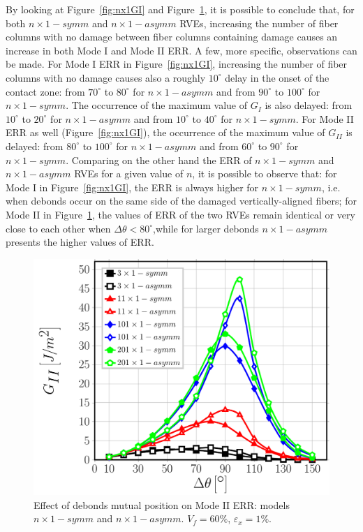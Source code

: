 \documentclass[smallextended]{svjour3}       %
\begin{document}
By looking at Figure~\ref{fig:nx1GI} and Figure~\ref{fig:nx1GII}, it is possible to conclude that, for both $n\times 1-symm$ and $n\times 1-asymm$ RVEs, increasing the number of fiber columns with no damage between fiber columns containing damage causes an increase in both Mode I and Mode II ERR. A few, more specific, observations can be made. For Mode I ERR in Figure~\ref{fig:nx1GI}, increasing the number of fiber columns with no damage causes also a roughly $10^{\circ}$ delay in the onset of the contact zone: from $70^\circ$ to $80^\circ$ for $n\times 1-asymm$ and from $90^\circ$ to $100^\circ$ for $n\times 1-symm$. The occurrence of the maximum value of $G_{I}$ is also delayed: from $10^\circ$ to $20^\circ$ for $n\times 1-asymm$ and from $10^\circ$ to $40^\circ$ for $n\times 1-symm$. For Mode II ERR as well (Figure~\ref{fig:nx1GI}), the occurrence of the maximum value of $G_{II}$  is delayed: from $80^\circ$ to $100^\circ$ for $n\times 1-asymm$ and from $60^\circ$ to $90^\circ$ for $n\times 1-symm$. Comparing on the other hand the ERR of $n\times 1-symm$ and $n\times 1-asymm$ RVEs for a given value of $n$, it is possible to observe that: for Mode I in Figure~\ref{fig:nx1GI}, the ERR is always higher for $n\times 1-symm$, i.e. when debonds occur on the same side of the damaged vertically-aligned fibers; for Mode II in Figure~\ref{fig:nx1GII}, the values of ERR of the two RVEs remain identical or very close to each other when $\Delta\theta<80^{\circ}$,while for larger debonds $n\times 1-asymm$ presents the higher values of ERR.

\begin{figure}[!h]
\centering
\includegraphics[width=\textwidth]{nx1-coupling-vf60-GII.pdf}
\caption{Effect of debonds mutual position on Mode II ERR: models $n\times 1-symm$ and $n\times 1-asymm$. $V_{f}=60\%$, $\varepsilon_{x}=1\%$.}\label{fig:nx1GII}
\end{figure}
\end{document}
